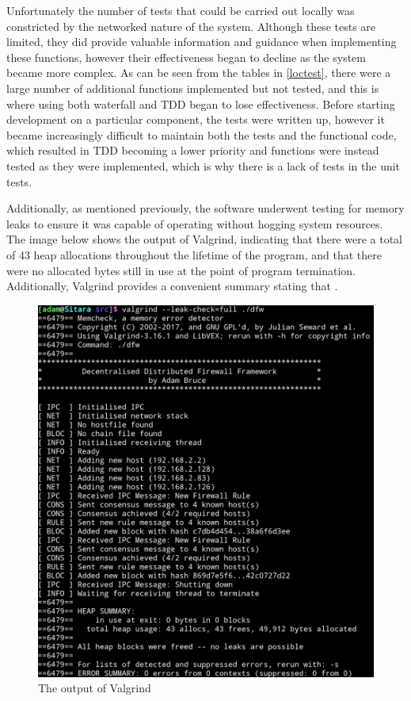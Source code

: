 \documentclass[a4paper, 11pt]{report}
\begin{document}
Unfortunately the number of tests that could be carried out locally was constricted by the networked nature of the system. Although these tests are limited, they did provide valuable information and guidance when implementing these functions, however their effectiveness began to decline as the system became more complex. As can be seen from the tables in \ref{loctest}, there were a large number of additional functions implemented but not tested, and this is where using both waterfall and \acrshort{TDD} began to lose effectiveness. Before starting development on a particular component, the tests were written up, however it became increasingly difficult to maintain both the tests and the functional code, which resulted in \acrshort{TDD} becoming a lower priority and functions were instead tested as they were implemented, which is why there is a lack of tests in the unit tests.

Additionally, as mentioned previously, the software underwent testing for memory leaks to ensure it was capable of operating without hogging system resources. The image below shows the output of Valgrind, indicating that there were a total of 43 heap allocations throughout the lifetime of the program, and that there were no allocated bytes still in use at the point of program termination. Additionally, Valgrind provides a convenient summary stating that .

\begin{figure}[H]
\centering
\includegraphics[width=\textwidth,keepaspectratio]{valgrind}
\caption{The output of Valgrind} 
\label{fig:valgrind}
\end{figure}
\end{document}
